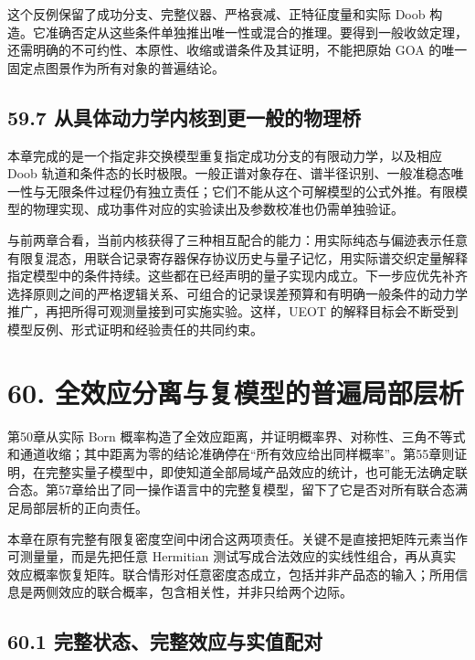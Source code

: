 \documentclass[
  11pt,
  oneside]{book}
\begin{document}
这个反例保留了成功分支、完整仪器、严格衰减、正特征度量和实际 Doob
构造。它准确否定从这些条件单独推出唯一性或混合的推理。要得到一般收敛定理，还需明确的不可约性、本原性、收缩或谱条件及其证明，不能把原始
GOA 的唯一固定点图景作为所有对象的普遍结论。

\hypertarget{ux4eceux5177ux4f53ux52a8ux529bux5b66ux5185ux6838ux5230ux66f4ux4e00ux822cux7684ux7269ux7406ux6865}{%
\section{59.7
从具体动力学内核到更一般的物理桥}\label{ux4eceux5177ux4f53ux52a8ux529bux5b66ux5185ux6838ux5230ux66f4ux4e00ux822cux7684ux7269ux7406ux6865}}

本章完成的是一个指定非交换模型重复指定成功分支的有限动力学，以及相应
Doob
轨道和条件态的长时极限。一般正谱对象存在、谱半径识别、一般准稳态唯一性与无限条件过程仍有独立责任；它们不能从这个可解模型的公式外推。有限模型的物理实现、成功事件对应的实验读出及参数校准也仍需单独验证。

与前两章合看，当前内核获得了三种相互配合的能力：用实际纯态与偏迹表示任意有限复混态，用联合记录寄存器保存协议历史与量子记忆，用实际谱交织定量解释指定模型中的条件持续。这些都在已经声明的量子实现内成立。下一步应优先补齐选择原则之间的严格逻辑关系、可组合的记录误差预算和有明确一般条件的动力学推广，再把所得可观测量接到可实施实验。这样，UEOT
的解释目标会不断受到模型反例、形式证明和经验责任的共同约束。

\hypertarget{ch-60}{%
\chapter{60. 全效应分离与复模型的普遍局部层析}\label{ch-60}}

第50章从实际 Born
概率构造了全效应距离，并证明概率界、对称性、三角不等式和通道收缩；其中距离为零的结论准确停在``所有效应给出同样概率''。第55章则证明，在完整实量子模型中，即使知道全部局域产品效应的统计，也可能无法确定联合态。第57章给出了同一操作语言中的完整复模型，留下了它是否对所有联合态满足局部层析的正向责任。

本章在原有完整有限复密度空间中闭合这两项责任。关键不是直接把矩阵元素当作可测量量，而是先把任意
Hermitian
测试写成合法效应的实线性组合，再从真实效应概率恢复矩阵。联合情形对任意密度态成立，包括并非产品态的输入；所用信息是两侧效应的联合概率，包含相关性，并非只给两个边际。

\hypertarget{ux5b8cux6574ux72b6ux6001ux5b8cux6574ux6548ux5e94ux4e0eux5b9eux503cux914dux5bf9}{%
\section{60.1
完整状态、完整效应与实值配对}\label{ux5b8cux6574ux72b6ux6001ux5b8cux6574ux6548ux5e94ux4e0eux5b9eux503cux914dux5bf9}}
\end{document}
